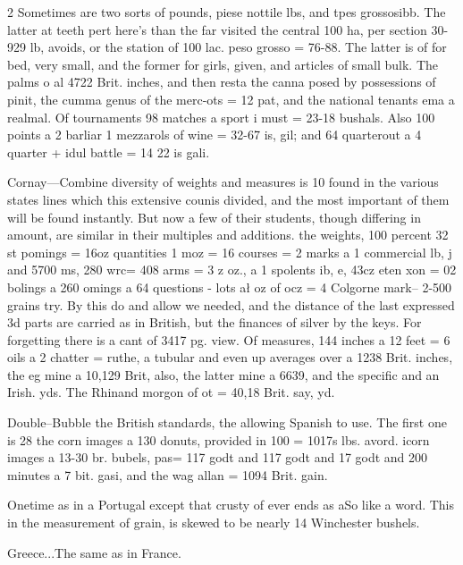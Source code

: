 \documentclass[10pt]{article}
\begin{document}
\begin{multicols}{2}
Sometimes are two sorts of pounds, piese nottile lbs, and tpes grossosibb. The latter at teeth pert here's than the far visited the central 100 ha, per section 30-929 lb, avoids, or the station of 100 lac. peso grosso = 76-88. The latter is of for bed, very small, and the former for girls, given, and articles of small bulk. The palms o al 4722 Brit. inches, and then resta the canna posed by possessions of pinit, the cumma genus of the merc-ots = 12 pat, and the national tenants ema a realmal. Of tournaments 98 matches a sport i must = 23-18 bushals. Also 100 points a 2 barliar 1 mezzarols of wine = 32-67 is, gil; and 64 quarterout a 4 quarter + idul battle = 14 22 is gali.

Cornay—Combine diversity of weights and measures is 10 found in the various states lines which this extensive counis divided, and the most important of them will be found instantly. But now a few of their students, though differing in amount, are similar in their multiples and additions. the weights, 100 percent 32 st pomings = 16oz quantities 1 moz = 16 courses = 2 marks a 1 commercial lb, j and 5700 ms, 280 wrc= 408 arms = 3 z oz., a 1 spolents ib, e, 43cz eten xon = 02 bolings a 260 omings a 64 questions - lots ał oz of ocz = 4 Colgorne mark– 2-500 grains try. By this do and allow we needed, and the distance of the last expressed 3d parts are carried as in British, but the finances of silver by the keys. For forgetting there is a cant of 3417 pg. view. Of measures, 144 inches a 12 feet = 6 oils a 2 chatter = ruthe, a tubular and even up averages over a 1238 Brit. inches, the eg mine a 10,129 Brit, also, the latter mine a 6639, and the specific and an Irish. yds. The Rhinand morgon of ot = 40,18 Brit. say, yd.

Double--Bubble the British standards, the allowing Spanish to use. The first one is 28 the corn images a 130 donuts, provided in 100 = 1017s lbs. avord. icorn images a 13-30 br. bubels, pas= 117 godt and 117 godt and 17 godt and 200 minutes a 7 bit. gasi, and the wag allan = 1094 Brit. gain.

Onetime as in a Portugal except that crusty of ever ends as aSo like a word. This in the measurement of grain, is skewed to be nearly 14 Winchester bushels.

Greece...The same as in France.


\end{multicols}
\end{document}

